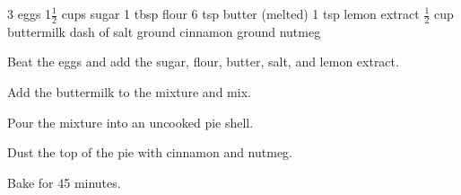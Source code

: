 \dishtype{\dessert}
\dishother{\vegetarian}
\begin{ingreds}
    3 eggs
    1$\frac{1}{2}$ cups sugar
    1 tbsp flour
    6 tsp butter (melted)
    1 tsp lemon extract
    $\frac{1}{2}$ cup buttermilk
    dash of salt
    ground cinnamon
    ground nutmeg
\end{ingreds}
\begin{method}
    Beat the eggs and add the sugar, flour, butter, salt, and lemon extract.\par
    Add the buttermilk to the mixture and mix.\par
    Pour the mixture into an uncooked pie shell.\par
    Dust the top of the pie with cinnamon and nutmeg.\par
    Bake for 45 minutes.
\end{method}